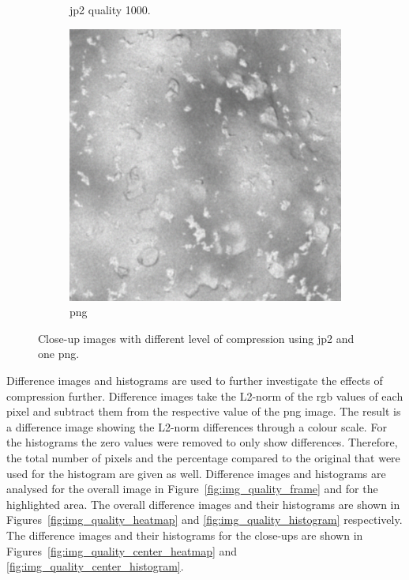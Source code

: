 \begin{figure}[htb]
\begin{subfigure}[b]{0.44\textwidth}
            \caption{\gls{jp2} quality 1000.}
            \label{fig:img_quality_1000}
        \end{subfigure}
        \begin{subfigure}[b]{0.44\textwidth}
            \centering
            \includegraphics[width=\textwidth]{doc/thesis/0_figures/compare_quality/set1/center/png_center.png}
            \caption{\gls{png}}
            \label{fig:img_quality_png}
        \end{subfigure}
    \caption{Close-up images with different level of compression using \gls{jp2} and one \gls{png}.}
    \label{fig:img_quality_comp}
\end{figure}

Difference images and histograms are used to further investigate the effects of compression further. Difference images take the L2-norm of the \gls{rgb} values of each pixel and subtract them from the respective value of the \gls{png} image. The result is a difference image showing the L2-norm differences through a colour scale. For the histograms the zero values were removed to only show differences. Therefore, the total number of pixels and the percentage compared to the original that were used for the histogram are given as well. Difference images and histograms are analysed for the overall image in Figure~\ref{fig:img_quality_frame} and for the highlighted area. The overall difference images and their histograms are shown in Figures~\ref{fig:img_quality_heatmap} and \ref{fig:img_quality_histogram} respectively. The difference images and their histograms for the close-ups are shown in Figures~\ref{fig:img_quality_center_heatmap} and \ref{fig:img_quality_center_histogram}.

